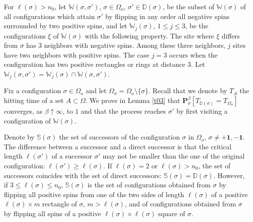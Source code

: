 \documentclass[reqno]{amsart}
\begin{document}
For $\ell (\sigma) > n_0$, let ${{\mathbb W}}(\sigma, \sigma')$, $\sigma \in
\Omega_o$, $\sigma'\in {{\mathbb D}}(\sigma)$, be the subset of ${{\mathbb W}}(\sigma)$ of all configurations which attain $\sigma'$ by flipping in
any order all negative spins surrounded by two positive spins, and let
${{\mathbb W}}_j(\sigma)$, $1\le j\le 3$, be the configurations $\xi$ of ${{\mathbb W}}(\sigma)$ with the following property.  The site where $\xi$ differs
from $\sigma$ has $3$ neighbors with negative spins.  Among these
three neighbors, $j$ sites have two neighbors with positive spins. The
case $j=3$ occurs when the configuration has two positive rectangles
or rings at distance $3$. Let ${{\mathbb W}}_j(\sigma, \sigma') = {{\mathbb W}}_j(\sigma) \cap {{\mathbb W}}(\sigma, \sigma')$.

Fix a configuration $\sigma \in \Omega_o$ and let $\Omega_\sigma =
\Omega_o \setminus \{\sigma\}$. Recall that we denote by $T_A$ the
hitting time of a set $A\subset \Omega$. We prove in Lemma \ref{t03}
that ${{\mathbf P}}^\beta_\sigma [T_{{{\mathbb D}}(\sigma)} = T_{\Omega_\sigma}]$
converges, as $\beta\uparrow\infty$, to $1$ and that the process
reaches $\sigma'$ by first visiting a configuration of ${{\mathbb W}}(\sigma)$.

Denote by ${{\mathbb S}}(\sigma)$ the set of successors of the configuration
$\sigma$ in $\Omega_o$, $\sigma \not = + {{\mathbf 1}}, - {{\mathbf 1}}$. The
difference between a successor and a direct successor is that the
critical length $\ell(\sigma')$ of a successor $\sigma'$ may not be
smaller than the one of the original configuration: $\ell(\sigma')\ge
\ell (\sigma)$. If $\ell (\sigma) =2$ or $\ell (\sigma) >n_0$, the set
of successors coincides with the set of direct successors: ${{\mathbb S}}(\sigma) = {{\mathbb D}}(\sigma)$.  However, if $3\le \ell (\sigma) \le n_0$,
${{\mathbb S}}(\sigma)$ is the set of configurations obtained from $\sigma$ by
flipping all positive spins from one of the two sides of length
$\ell(\sigma)$ of a positive $\ell(\sigma) \times m$ rectangle of
$\sigma$, $m> \ell(\sigma)$, and of configurations obtained from
$\sigma$ by flipping all spins of a positive $\ell(\sigma)\times
\ell(\sigma)$ square of $\sigma$.
\end{document}
